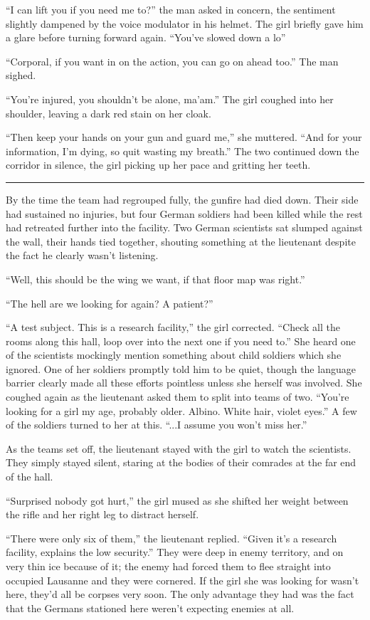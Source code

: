 \begin{Standard}
``I can lift you if you need me to?'' the man asked in concern, the sentiment
slightly dampened by the voice modulator in his helmet. The girl briefly gave him
a glare before turning forward again. ``You've slowed down a lo\textemdash{}''

``Corporal, if you want in on the action, you can go on ahead too.'' The man sighed.

``You're injured, you shouldn't be alone, ma'am.'' The girl coughed into her shoulder,
leaving a dark red stain on her cloak.

``Then keep your hands on your gun and guard me,'' she muttered. ``And for your
information, I'm dying, so quit wasting my breath.'' The two continued down the corridor
in silence, the girl picking up her pace and gritting her teeth.

\fancybreak{* * *}

By the time the team had regrouped fully, the gunfire had died down. Their side had
sustained no injuries, but four German soldiers had been killed while the rest had
retreated further into the facility. Two German scientists sat slumped against the wall,
their hands tied together, shouting something at the lieutenant despite the fact he clearly
wasn't listening.

``Well, this should be the wing we want, if that floor map was right.''

``The hell are we looking for again? A patient?''

``A test subject. This is a research facility,'' the girl corrected. ``Check all
the rooms along this hall, loop over into the next one if you need to.'' She heard
one of the scientists mockingly mention something about child soldiers which she
ignored. One of her soldiers promptly told him to be quiet, though the language
barrier clearly made all these efforts pointless unless she herself was involved.
She coughed again as the lieutenant asked them to split into teams of two. ``You're
looking for a girl my age, probably older. Albino. White hair, violet eyes.'' A few
of the soldiers turned to her at this. ``...I assume you won't miss her.''

As the teams set off, the lieutenant stayed with the girl to watch the scientists.
They simply stayed silent, staring at the bodies of their comrades at the far end
of the hall.

``Surprised nobody got hurt,'' the girl mused as she shifted her weight between
the rifle and her right leg to distract herself.

``There were only six of them,'' the lieutenant replied. ``Given it's a research
facility, explains the low security.'' They were deep in enemy territory, and
on very thin ice because of it; the enemy had forced them to flee straight into
occupied Lausanne and they were cornered. If the girl she was looking for wasn't
here, they'd all be corpses very soon. The only advantage they had was the fact
that the Germans stationed here weren't expecting enemies at all.


\end{Standard}
